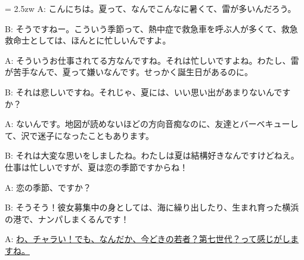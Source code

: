 \documentclass[11pt]{amsart}
\title{}
\author{}
\newenvironment{hangall}[1]{\hangindent = 2.5zw\everypar{\hangindent = 2.5zw}}{}
\begin{document}
\maketitle
\begin{hangall}{}%
A: こんにちは。夏って、なんでこんなに暑くて、雷が多いんだろう。

B: そうですねー。こういう季節って、熱中症で救急車を呼ぶ人が多くて、救急救命士としては、ほんとに忙しいんですよ。

A: そういうお仕事されてる方なんですね。それは忙しいですよね。わたし、雷が苦手なんで、夏って嫌いなんです。せっかく誕生日があるのに。

B: それは悲しいですね。それじゃ、夏には、いい思い出があまりないんですか？

A: ないんです。地図が読めないほどの方向音痴なのに、友達とバーベキューして、沢で迷子になったこともあります。

B: それは大変な思いをしましたね。わたしは夏は結構好きなんですけどねえ。仕事は忙しいですが、夏は恋の季節ですからね！

A: 恋の季節、ですか？

B: そうそう！彼女募集中の身としては、海に繰り出したり、生まれ育った横浜の港で、ナンパしまくるんです！

A: \ul{わ、チャラい！でも、なんだか、今どきの若者？第七世代？って感じがしますね。}\end{hangall}
\end{document}

